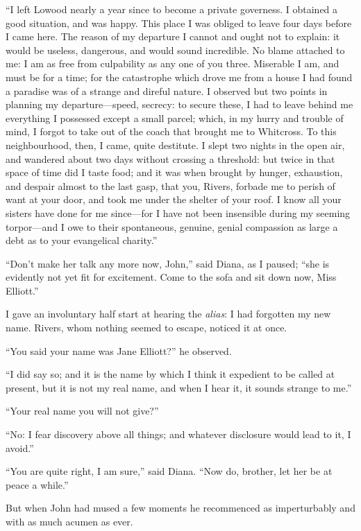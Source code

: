 \enquote{I left Lowood nearly a year since to become a private
	governess. I obtained a good situation, and was happy. This place I
	was obliged to leave four days before I came here. The reason of my
	departure I cannot and ought not to explain: it would be useless,
	dangerous, and would sound incredible. No blame attached to me: I am as
	free from culpability as any one of you three. Miserable I am, and must
	be for a time; for the catastrophe which drove me from a house I had
	found a paradise was of a strange and direful nature. I observed but
	two points in planning my departure---speed, secrecy: to secure these, I
	had to leave behind me everything I possessed except a small parcel;
	which, in my hurry and trouble of mind, I forgot to take out of the
	coach that brought me to Whitcross. To this neighbourhood, then, I
	came, quite destitute. I slept two nights in the open air, and wandered
	about two days without crossing a threshold: but twice in that space of
	time did I taste food; and it was when brought by hunger, exhaustion,
	and despair almost to the last gasp, that you, \Mr{} Rivers, forbade me to
	perish of want at your door, and took me under the shelter of your
	roof. I know all your sisters have done for me since---for I have not
	been insensible during my seeming torpor---and I owe to their
	spontaneous, genuine, genial compassion as large a debt as to your
	evangelical charity.}

\enquote{Don't make her talk any more now, \St{} John,} said Diana, as I
paused; \enquote{she is evidently not yet fit for excitement. Come to
	the sofa and sit down now, Miss Elliott.}

I gave an involuntary half start at hearing the \emph{alias}: I had
forgotten my new name. \Mr{} Rivers, whom nothing seemed to escape,
noticed it at once.

\enquote{You said your name was Jane Elliott?} he observed.

\enquote{I did say so; and it is the name by which I think it expedient
	to be called at present, but it is not my real name, and when I hear it,
	it sounds strange to me.}

\enquote{Your real name you will not give?}

\enquote{No: I fear discovery above all things; and whatever disclosure
	would lead to it, I avoid.}

\enquote{You are quite right, I am sure,} said Diana. \enquote{Now do,
	brother, let her be at peace a while.}

But when \St{} John had mused a few moments he recommenced as
imperturbably and with as much acumen as ever.

